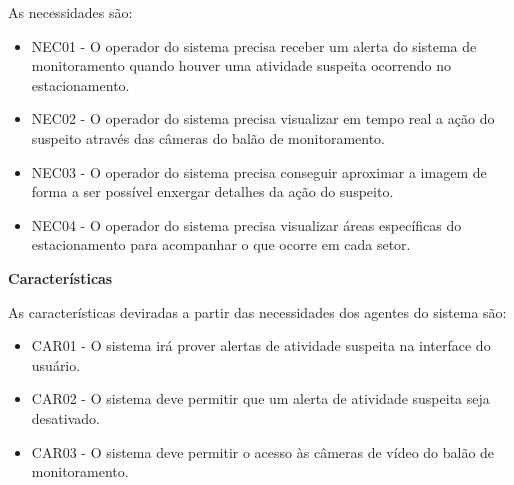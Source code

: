 As necessidades são:
\begin{itemize}
	\item NEC01 - O operador do sistema precisa receber um alerta do sistema de monitoramento quando houver uma atividade suspeita ocorrendo no estacionamento.
	\item NEC02 - O operador do sistema precisa visualizar em tempo real a ação do suspeito através das câmeras do balão de monitoramento.
	\item NEC03 - O operador do sistema precisa conseguir aproximar a imagem de forma a ser possível enxergar detalhes da ação do suspeito.
	\item NEC04 - O operador do sistema precisa visualizar áreas específicas do estacionamento para acompanhar o que ocorre em cada setor.
\end{itemize}

\textbf{Características}
\par
As características deviradas a partir das necessidades dos agentes do sistema são:
\begin{itemize}
	\item CAR01 - O sistema irá prover alertas de atividade suspeita na interface do usuário.
	\item CAR02 - O sistema deve permitir que um alerta de atividade suspeita seja desativado.
	\item CAR03 - O sistema deve permitir o acesso às câmeras de vídeo do balão de monitoramento.
\end{itemize}